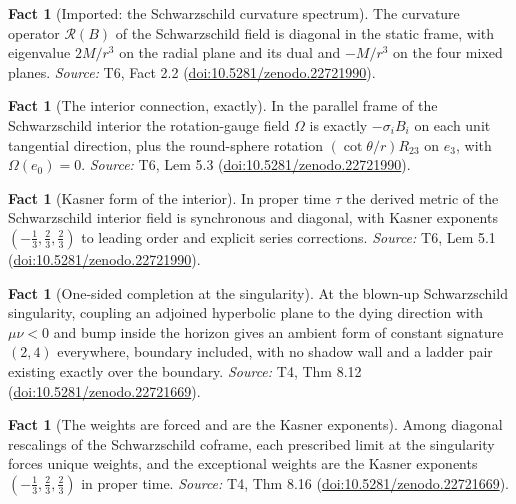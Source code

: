 \documentclass[11pt]{article}
\theoremstyle{definition}
\newtheorem{fact}[theorem]{Fact}
\theoremstyle{plain}
\newcommand{\changedmark}[2]{\marginpar{\raggedright\scriptsize\color{#1}#2}}
\begin{document}
\begin{fact}[Imported: the Schwarzschild curvature spectrum]\label{c:interior.imported-schwarzschild-curvature-spectrum}
\changedmark{gray}{reworded}
The curvature operator $\mathcal{R}(B)$ of the Schwarzschild field is diagonal in the static frame, with eigenvalue $2M/r^3$ on the radial plane and its dual and $-M/r^3$ on the four mixed planes.
\emph{Source:} T6, Fact 2.2 (\href{https://doi.org/10.5281/zenodo.22721990}{doi:10.5281/zenodo.22721990}).
\end{fact}

\begin{fact}[The interior connection, exactly]\label{c:interior.interior-connection-exactly}
In the parallel frame of the Schwarzschild interior the rotation-gauge field $\Omega$ is exactly $-\sigma_i B_i$ on each unit tangential direction, plus the round-sphere rotation $(\cot\theta/r)R_{23}$ on $e_3$, with $\Omega(e_0) = 0$.
\emph{Source:} T6, Lem 5.3 (\href{https://doi.org/10.5281/zenodo.22721990}{doi:10.5281/zenodo.22721990}).
\end{fact}

\begin{fact}[Kasner form of the interior]\label{c:interior.kasner-form-interior}
In proper time $\tau$ the derived metric of the Schwarzschild interior field is synchronous and diagonal, with Kasner exponents $(-\tfrac13, \tfrac23, \tfrac23)$ to leading order and explicit series corrections.
\emph{Source:} T6, Lem 5.1 (\href{https://doi.org/10.5281/zenodo.22721990}{doi:10.5281/zenodo.22721990}).
\end{fact}

\begin{fact}[One-sided completion at the singularity]\label{c:sheaf.one-sided-completion-singularity}
At the blown-up Schwarzschild singularity, coupling an adjoined hyperbolic plane to the dying direction with $\mu\nu < 0$ and bump inside the horizon gives an ambient form of constant signature $(2,4)$ everywhere, boundary included, with no shadow wall and a ladder pair existing exactly over the boundary.
\emph{Source:} T4, Thm 8.12 (\href{https://doi.org/10.5281/zenodo.22721669}{doi:10.5281/zenodo.22721669}).
\end{fact}

\begin{fact}[The weights are forced and are the Kasner exponents]\label{c:sheaf.weights-are-forced-are-kasner-exponents}
Among diagonal rescalings of the Schwarzschild coframe, each prescribed limit at the singularity forces unique weights, and the exceptional weights are the Kasner exponents $(-\tfrac13, \tfrac23, \tfrac23)$ in proper time.
\emph{Source:} T4, Thm 8.16 (\href{https://doi.org/10.5281/zenodo.22721669}{doi:10.5281/zenodo.22721669}).
\end{fact}
\end{document}
